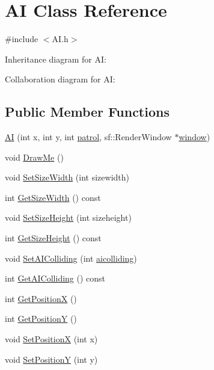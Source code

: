 \hypertarget{classAI}{}\section{AI Class Reference}
\label{classAI}


{\ttfamily \#include $<$A\+I.\+h$>$}



Inheritance diagram for AI\+:


Collaboration diagram for AI\+:
\subsection*{Public Member Functions}
\begin{DoxyCompactItemize}
\item 
\hyperlink{classAI_a30783f011bab5e461811f1f513261424}{AI} (int x, int y, int \hyperlink{classAI_ac28e1dce23ebfb9beb0542ddd46ec3da}{patrol}, sf\+::\+Render\+Window $\ast$\hyperlink{classAI_a0484a23ffd7e5c09b7fc252350a2c8c4}{window})
\item 
void \hyperlink{classAI_a05612024ed9f8c37bf239a085e8e1734}{Draw\+Me} ()
\item 
void \hyperlink{classAI_a4b25d77453af108dcfefc096a9153233}{Set\+Size\+Width} (int sizewidth)
\item 
int \hyperlink{classAI_a9d84d316c17038eecee2abf8e2141385}{Get\+Size\+Width} () const 
\item 
void \hyperlink{classAI_ab63724e76ed2efa586b09593c62edc51}{Set\+Size\+Height} (int sizeheight)
\item 
int \hyperlink{classAI_adb31196a4fcbbe4d92299e899f04d789}{Get\+Size\+Height} () const 
\item 
void \hyperlink{classAI_a31e4fec3672db036e511ca2c6a5d2b75}{Set\+A\+I\+Colliding} (int \hyperlink{classAI_a17f6d2ecc23b43a425623947b639656d}{aicolliding})
\item 
int \hyperlink{classAI_a0757c03ecae2e2f3145ad1fc1eab2f03}{Get\+A\+I\+Colliding} () const 
\item 
int \hyperlink{classAI_ade2ee4c9c75cdf9f4edd85227193e73d}{Get\+PositionX} ()
\item 
int \hyperlink{classAI_af234b480b8502f3dc1b1f3bac15e8b98}{Get\+PositionY} ()
\item 
void \hyperlink{classAI_a5436f878f8f02597de9ec5ebfdcc7cd9}{Set\+PositionX} (int x)
\item 
void \hyperlink{classAI_a4e042958bb678aebdee4af9925efa389}{Set\+PositionY} (int y)
\item 

\end{DoxyCompactItemize}
